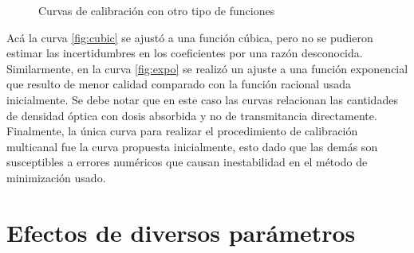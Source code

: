 \begin{figure}[H]
	\centering
	\hfill
	\caption{Curvas de calibración con otro tipo de funciones}
	\label{fig:CurvasAdicionales}
\end{figure}

Acá la curva \ref{fig:cubic} se ajustó a una función cúbica, pero no se pudieron estimar las incertidumbres en los coeficientes por una razón desconocida. Similarmente, en la curva \ref{fig:expo} se realizó un ajuste a una función exponencial que resulto de menor calidad comparado con la función racional usada inicialmente. Se debe notar que en este caso las curvas relacionan las cantidades  de densidad óptica con dosis absorbida y no de transmitancia directamente.\\

Finalmente, la única curva para realizar el  procedimiento de calibración multicanal fue la curva propuesta inicialmente, esto dado que las demás son susceptibles a errores numéricos que causan inestabilidad en el método de minimización usado.


\section{Efectos de diversos parámetros}

